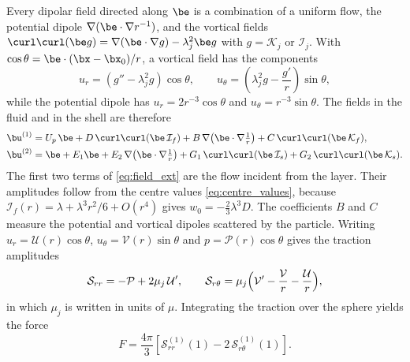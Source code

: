 Every dipolar field directed along $\be$ is a combination of a uniform flow, the potential dipole
$\nabla(\be\cdot\nabla r^{-1})$, and the vortical fields $\curl\curl(\be g)=\nabla(\be\cdot\nabla g)-\lambda_j^2\be g$
with $g=\mathcal K_j$ or $\mathcal I_j$. With $\cos\theta=\be\cdot(\bx-\bx_0)/r$, a vortical field has the components
\begin{equation}
  u_r=\left(g''-\lambda_j^2g\right)\cos\theta,\qquad u_\theta=\left(\lambda_j^2g-\frac{g'}{r}\right)\sin\theta,
  \label{eq:vort_radial}
\end{equation}
while the potential dipole has $u_r=2r^{-3}\cos\theta$ and $u_\theta=r^{-3}\sin\theta$. The fields in the fluid and in
the shell are therefore
\begin{subequations}\label{eq:fields}
\begin{align}
  \bu^{(1)}&=U_p\,\be+D\,\curl\curl(\be\,\mathcal I_f)
  +B\,\nabla\!\left(\be\cdot\nabla\tfrac1r\right)+C\,\curl\curl(\be\,\mathcal K_f),
  \label{eq:field_ext}\\
  \bu^{(2)}&=\be+E_1\be+E_2\,\nabla\!\left(\be\cdot\nabla\tfrac1r\right)
  +G_1\,\curl\curl(\be\,\mathcal I_s)+G_2\,\curl\curl(\be\,\mathcal K_s).
  \label{eq:field_shell}
\end{align}
\end{subequations}
The first two terms of \cref{eq:field_ext} are the flow incident from the layer. Their amplitudes follow from the centre
values \eqref{eq:centre_values}, because $\mathcal I_f(r)=\lambda+\lambda^3r^2/6+O(r^4)$ gives $w_0=-\tfrac23\lambda^3D$.
The coefficients $B$ and $C$ measure the potential and vortical dipoles scattered by the particle. Writing
$u_r=\mathcal U(r)\cos\theta$, $u_\theta=\mathcal V(r)\sin\theta$ and $p=\mathcal P(r)\cos\theta$ gives the traction
amplitudes
\begin{equation*}
  \mathcal S_{rr}=-\mathcal P+2\mu_j\,\mathcal U',\qquad
  \mathcal S_{r\theta}=\mu_j\Bigl(\mathcal V'-\frac{\mathcal V}{r}-\frac{\mathcal U}{r}\Bigr),
\end{equation*}
in which $\mu_j$ is written in units of $\mu$. Integrating the traction over the sphere yields the force
\begin{equation}
  F=\frac{4\pi}{3}\left[\mathcal S^{(1)}_{rr}(1)-2\,\mathcal S^{(1)}_{r\theta}(1)\right].
  \label{eq:force_amplitudes}
\end{equation}

